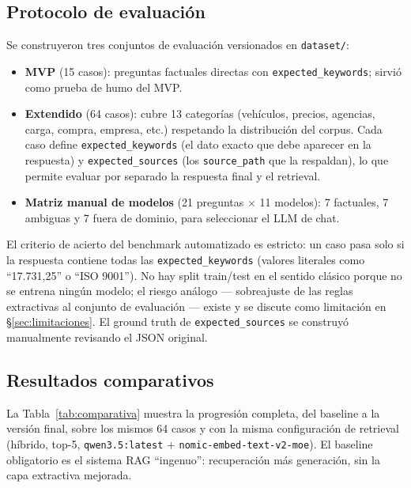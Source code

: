 \documentclass[11pt,a4paper]{article}
\newcommand{\code}[1]{\texttt{#1}}
\begin{document}
\subsection{Protocolo de evaluación}

Se construyeron tres conjuntos de evaluación versionados en
\code{dataset/}:

\begin{itemize}
    \item \textbf{MVP} (15 casos): preguntas factuales directas con
    \code{expected\_keywords}; sirvió como prueba de humo del MVP.
    \item \textbf{Extendido} (64 casos): cubre 13 categorías (vehículos,
    precios, agencias, carga, compra, empresa, etc.) respetando la
    distribución del corpus. Cada caso define \code{expected\_keywords} (el
    dato exacto que debe aparecer en la respuesta) y
    \code{expected\_sources} (los \code{source\_path} que la respaldan), lo
    que permite evaluar por separado la respuesta final y el retrieval.
    \item \textbf{Matriz manual de modelos} (21 preguntas $\times$ 11
    modelos): 7 factuales, 7 ambiguas y 7 fuera de dominio, para seleccionar
    el LLM de chat.
\end{itemize}

El criterio de acierto del benchmark automatizado es estricto: un caso pasa
solo si la respuesta contiene todas las \code{expected\_keywords} (valores
literales como ``17.731,25'' o ``ISO 9001''). No hay split train/test en el
sentido clásico porque no se entrena ningún modelo; el riesgo análogo ---
sobreajuste de las reglas extractivas al conjunto de evaluación --- existe y
se discute como limitación en §\ref{sec:limitaciones}. El ground truth de
\code{expected\_sources} se construyó manualmente revisando el JSON original.

\subsection{Resultados comparativos}

La Tabla~\ref{tab:comparativa} muestra la progresión completa, del baseline a
la versión final, sobre los mismos 64 casos y con la misma configuración de
retrieval (híbrido, top-5, \code{qwen3.5:latest} +
\code{nomic-embed-text-v2-moe}). El baseline obligatorio es el sistema RAG
``ingenuo'': recuperación más generación, sin la capa extractiva mejorada.
\end{document}

